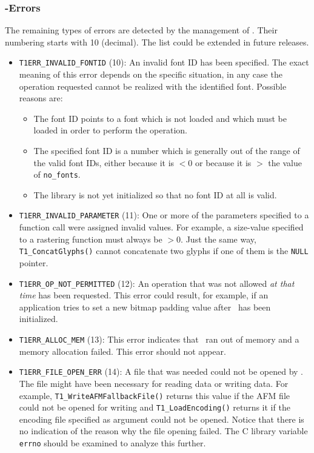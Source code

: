 \subsubsection{\tonelib-Errors}
The remaining types of errors are detected by the management of \tonelib. Their
numbering starts with 10 (decimal). The list could be extended in future
releases. 
\begin{itemize}
\item \verb+T1ERR_INVALID_FONTID+ (10): An invalid font ID has been
  specified. The exact meaning of this error depends on the specific
  situation, in any case the operation requested cannot be realized with the
  identified font. Possible reasons are:
  \begin{itemize}
  \item The font ID points to a font which is not loaded and which must be
    loaded in order to perform the operation.
  \item The specified font ID is a number which is generally out of the range
    of the valid font IDs, either because it is $<0$ or because it is $>$ the
    value of \verb+no_fonts+.
  \item The library is not yet initialized so that no font ID at all is valid.
  \end{itemize}
\item \verb+T1ERR_INVALID_PARAMETER+ (11): One or more of the parameters
  specified to a function call were assigned invalid values. For example, a
  size-value specified to a rastering function must always be $>0$. Just the
  same way, \verb+T1_ConcatGlyphs()+ cannot concatenate two glyphs if one of
  them is the \verb+NULL+ pointer.
\item \verb+T1ERR_OP_NOT_PERMITTED+ (12): An operation that was not allowed
  {\em at that time} has been requested. This error could result, for example,
  if an application tries to set a new bitmap padding value after \tonelib\
  has been initialized. 
\item \verb+T1ERR_ALLOC_MEM+ (13): This error indicates that \tonelib\ ran out
  of memory and a memory allocation failed. This error should not appear.
\item \verb+T1ERR_FILE_OPEN_ERR+ (14): A file that was needed could not be
  opened by \tonelib. The file might have been necessary for reading data or
  writing data. For example, \verb+T1_WriteAFMFallbackFile()+ returns this
  value if the AFM file could not be opened for writing and
  \verb+T1_LoadEncoding()+ returns it if the encoding file specified as
  argument could not be opened. Notice that there is no indication of the
  reason why the file opening failed. The C library
  variable \verb+errno+ should be examined to analyze this further.


\end{itemize}
